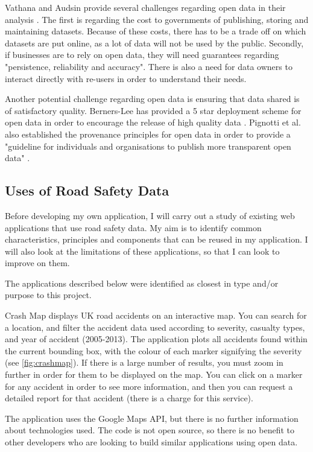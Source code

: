 \documentclass[authoryearcitations]{UoYCSproject}
\begin{document}
Vathana and Audsin provide several challenges regarding open data in their analysis \citep{Vathana}. The first is regarding the cost to governments of publishing, storing and maintaining datasets. Because of these costs, there has to be a trade off on which datasets are put online, as a lot of data will not be used by the public. Secondly, if businesses are to rely on open data, they will need guarantees regarding "persistence, reliability and accuracy". There is also a need for data owners to interact directly with re-users in order to understand their needs.

Another potential challenge regarding open data is ensuring that data shared is of satisfactory quality. Berners-Lee has provided a 5 star deployment scheme for open data in order to encourage the release of high quality data \citep{Berners-Lee2006}. Pignotti et al. also established the provenance principles for open data in order to provide a "guideline for individuals and organisations to publish more transparent open data" \citep{Pignotti2011}.


\subsection{Uses of Road Safety Data}

Before developing my own application, I will carry out a study of existing web applications that use road safety data. My aim is to identify common characteristics, principles and components that can be reused in my application. I will also look at the limitations of these applications, so that I can look to improve on them.

The applications described below were identified as closest in type and/or purpose to this project.
 
Crash Map \citep{crashmap} displays UK road accidents on an interactive map. You can search for a location, and filter the accident data used according to severity, casualty types, and year of accident (2005-2013). The application plots all accidents found within the current bounding box, with the colour of each marker signifying the severity (see \autoref{fig:crashmap}). If there is a large number of results, you must zoom in further in order for them to be displayed on the map. You can click on a marker for any accident in order to see more information, and then you can request a detailed report for that accident (there is a charge for this service).

The application uses the Google Maps API, but there is no further information about technologies used. The code is not open source, so there is no benefit to other developers who are looking to build similar applications using open data. 
\end{document}
